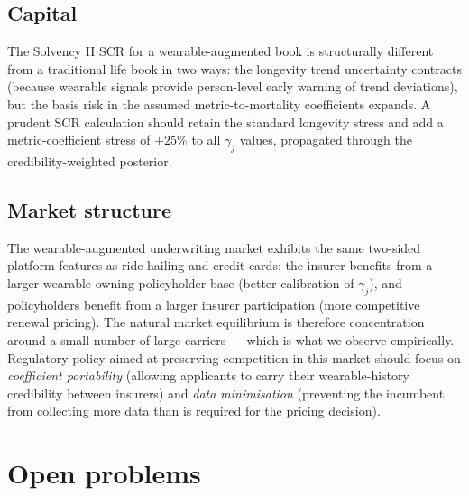 \documentclass[11pt,a4paper]{article}
\let\origsection\section
\renewcommand{\section}{\clearpage\origsection}
\theoremstyle{ia}
\newcommand{\1}{\mathbf{1}}
\begin{document}
\subsection{Capital}\label{ss:cap-impl}

The Solvency II SCR for a wearable-augmented book is structurally
different from a traditional life book in two ways: the longevity
trend uncertainty contracts (because wearable signals provide
person-level early warning of trend deviations), but the basis
risk in the assumed metric-to-mortality coefficients expands. A
prudent SCR calculation should retain the standard longevity stress
and add a metric-coefficient stress of $\pm 25\%$ to all
$\gamma_j$ values, propagated through the credibility-weighted
posterior.

\subsection{Market structure}\label{ss:mkt-impl}

The wearable-augmented underwriting market exhibits the same
two-sided platform features as ride-hailing and credit cards: the
insurer benefits from a larger wearable-owning policyholder base
(better calibration of $\gamma_j$), and policyholders benefit from
a larger insurer participation (more competitive renewal pricing).
The natural market equilibrium is therefore concentration around a
small number of large carriers --- which is what we observe
empirically. Regulatory policy aimed at preserving competition in
this market should focus on \emph{coefficient portability}
(allowing applicants to carry their wearable-history credibility
between insurers) and \emph{data minimisation} (preventing the
incumbent from collecting more data than is required for the
pricing decision).

\section{Open problems}\label{sec:open}
\end{document}
